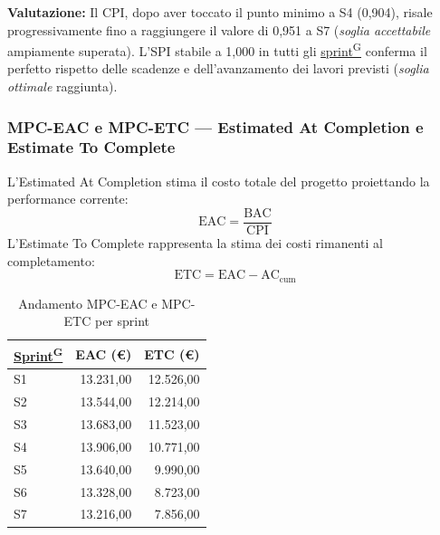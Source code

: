 \documentclass[a4paper,12pt]{article}
\providecommand{\glslink}[2]{\href{https://alittlebyte-19.github.io/Documentazione/glossario.html\#gls-#1}{\underline{#2}\textsuperscript{\scriptsize G}}}
\begin{document}
\noindent\textbf{Valutazione:} Il CPI, dopo aver toccato il punto minimo a S4 (0,904), risale progressivamente fino a raggiungere il valore di 0,951 a S7 (\emph{soglia accettabile}  ampiamente superata). L'SPI stabile a 1,000 in tutti gli \glslink{sprint}{sprint} conferma il perfetto rispetto delle scadenze e dell'avanzamento dei lavori previsti (\emph{soglia ottimale} raggiunta).

\subsubsection{MPC-EAC e MPC-ETC — Estimated At Completion e Estimate To Complete}

L'Estimated At Completion stima il costo totale del progetto proiettando la performance corrente:
\[
  \text{EAC} = \frac{\text{BAC}}{\text{CPI}}
\]
L'Estimate To Complete rappresenta la stima dei costi rimanenti al completamento:
\[
  \text{ETC} = \text{EAC} - \text{AC}_\text{cum}
\]

\begin{table}[H]
\centering
{}
\begin{tabular}{|l|r|r|}
    \hline
    \rowcolor{gray!35}
    \textbf{\glslink{sprint}{Sprint}} & \textbf{EAC (\euro)} & \textbf{ETC (\euro)} \\
    \hline
    S1 & 13.231,00 & 12.526,00 \\
    S2 & 13.544,00 & 12.214,00 \\
    S3 & 13.683,00 & 11.523,00 \\
    S4 & 13.906,00 & 10.771,00 \\
    S5 & 13.640,00 & 9.990,00 \\
    S6 & 13.328,00 & 8.723,00 \\
    S7 & 13.216,00 & 7.856,00 \\
    \hline
\end{tabular}
\caption{Andamento MPC-EAC e MPC-ETC per sprint}
\end{table}
\end{document}
